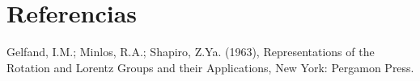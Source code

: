 \documentclass{article}
\theoremstyle{plain}
\theoremstyle{definition}
\theoremstyle{remark}
\begin{document}
\section{Referencias}

\begin{thebibliography}{9}

  Gelfand, I.M.; Minlos, R.A.; Shapiro, Z.Ya. (1963),
  Representations of the Rotation and Lorentz Groups and their Applications,
  New York: Pergamon Press.

\end{thebibliography}
\end{document}
